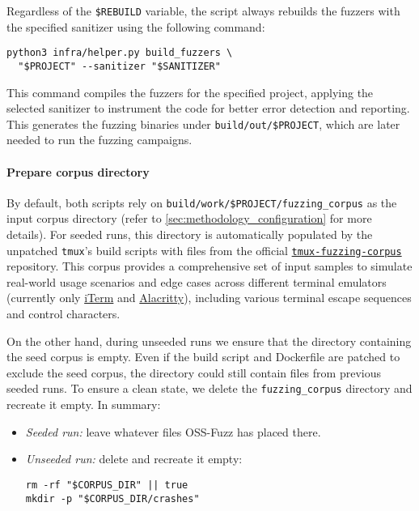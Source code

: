 Regardless of the \texttt{\$REBUILD} variable, the script always rebuilds the fuzzers with the specified sanitizer using the following command:

\begin{verbatim}
python3 infra/helper.py build_fuzzers \
  "$PROJECT" --sanitizer "$SANITIZER"
\end{verbatim}

This command compiles the fuzzers for the specified project, applying the selected sanitizer to instrument the code for better error detection and reporting. This generates the fuzzing binaries under \texttt{build/out/\$PROJECT}, which are later needed to run the fuzzing campaigns.

\noindent \paragraph{Prepare corpus directory}

By default, both scripts rely on \texttt{build/work/\$PROJECT/fuzzing\_corpus} as the input corpus directory (refer to \autoref{sec:methodology_configuration} for more details). For seeded runs, this directory is automatically populated by the unpatched \texttt{tmux}'s build scripts with files from the official \href{https://github.com/tmux/tmux-fuzzing-corpus/}{\texttt{tmux-fuzzing-corpus}} repository. This corpus provides a comprehensive set of input samples to simulate real-world usage scenarios and edge cases across different terminal emulators (currently only \href{https://iterm2.com/}{iTerm} and \href{https://alacritty.org/}{Alacritty}), including various terminal escape sequences and control characters. \cite{tmux:tmux-fuzzing-corpus}

On the other hand, during unseeded runs we ensure that the directory containing the seed corpus is empty. Even if the build script and Dockerfile are patched to exclude the seed corpus, the directory could still contain files from previous seeded runs. To ensure a clean state, we delete the \texttt{fuzzing\_corpus} directory and recreate it empty. In summary:

\begin{itemize}
	\item \emph{Seeded run:} leave whatever files OSS-Fuzz has placed there.
	\item \emph{Unseeded run:} delete and recreate it empty:
	      \begin{verbatim}
rm -rf "$CORPUS_DIR" || true
mkdir -p "$CORPUS_DIR/crashes"
\end{verbatim}
\end{itemize}

